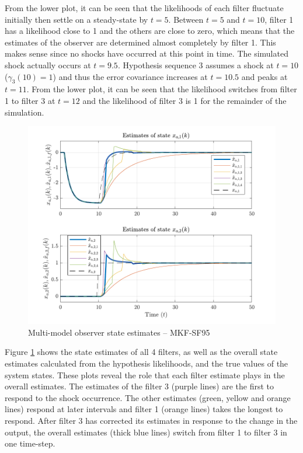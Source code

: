 From the lower plot, it can be seen that the likelihoods of each filter fluctuate initially then settle on a steady-state by $t=5$. Between $t=5$ and $t=10$, filter 1 has a likelihood close to 1 and the others are close to zero, which means that the estimates of the observer are determined almost completely by filter 1. This makes sense since no shocks have occurred at this point in time. The simulated shock actually occurs at $t=9.5$. Hypothesis sequence 3 assumes a shock at $t=10$ ($\gamma_3(10)=1$) and thus the error covariance increases at $t=10.5$ and peaks at $t=11$. From the lower plot, it can be seen that the likelihood switches from filter 1 to filter 3 at $t=12$ and the likelihood of filter 3 is 1 for the remainder of the simulation.

\begin{figure}[htp]
	\centering
	\includegraphics[width=13cm]{images/rod_MKF_test_sim_MKF_SF95_x_est.pdf}
	\caption{Multi-model observer state estimates – MKF-SF95}
	\label{fig:rod-obs-sim-test-x_est-SF95}
\end{figure}
Figure \ref{fig:rod-obs-sim-test-x_est-SF95} shows the state estimates of all 4 filters, as well as the overall state estimates calculated from the hypothesis likelihoods, and the true values of the system states. These plots reveal the role that each filter estimate plays in the overall estimates. The estimates of the filter 3 (purple lines) are the first to respond to the shock occurrence. The other estimates (green, yellow and orange lines) respond at later intervals and filter 1 (orange lines) takes the longest to respond. After filter 3 has corrected its estimates in response to the change in the output, the overall estimates (thick blue lines) switch from filter 1 to filter 3 in one time-step.

